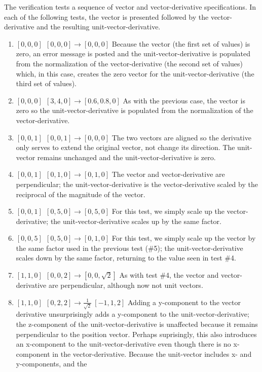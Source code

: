 \documentclass[11pt,fleqn]{report}
\begin{document}
The verification tests a sequence of vector and vector-derivative
specifications. In each of the following tests, the vector is presented
followed by the vector-derivative and the resulting unit-vector-derivative.
\begin{enumerate}
\item $[0,0,0]~~[0,0,0] \rightarrow [0,0,0]$
Because the vector (the first set of values) is
zero, an error message is posted and the unit-vector-derivative is
populated from the normalization of the vector-derivative (the
second set of values) which, in this
case, creates the zero vector for the unit-vector-derivative (the
third set of values).
\item $[0,0,0]~~[3,4,0] \rightarrow [0.6,0.8,0]$
As with the previous case, the vector is zero so the
unit-vector-derivative is
populated from the normalization of the vector-derivative.
\item $[0,0,1]~~[0,0,1] \rightarrow [0,0,0]$
The two vectors are aligned so the derivative only serves to extend
the original vector, not change its direction. The unit-vector
remains unchanged and the unit-vector-derivative is zero.
\item $[0,0,1]~~[0,1,0] \rightarrow [0,1,0]$
The vector and vector-derivative are perpendicular;
the unit-vector-derivative is the vector-derivative scaled by
the reciprocal of the magnitude of the vector.
\item $[0,0,1]~~[0,5,0] \rightarrow [0,5,0]$
For this test, we simply scale up the vector-derivative;
the unit-vector-derivative scales up by the same factor.
\item $[0,0,5]~~[0,5,0] \rightarrow [0,1,0]$
For this test, we simply scale up the vector by the same factor used
in the previous test (\#5);
the unit-vector-derivative scales down by the same factor, returning
to the value seen in test \#4.
\item $[1,1,0]~~[0,0,2] \rightarrow [0,0,\sqrt2]$
As with test \#4, the vector and vector-derivative are
perpendicular, although now not unit vectors.
\item $[1,1,0]~~[0,2,2] \rightarrow \frac{1}{\sqrt2}~[-1,1,2]$
Adding a y-component to the vector derivative unsurprisingly adds a
y-component to the unit-vector-derivative; the
z-component of the unit-vector-derivative is unaffected because it
remains perpendicular to the position vector. Perhaps suprisingly,
this also introduces an x-component to the unit-vector-derivative
even though there is no x-component in the vector-derivative.
Because the unit-vector includes x- and y-components, and the

\end{enumerate}
\end{document}

